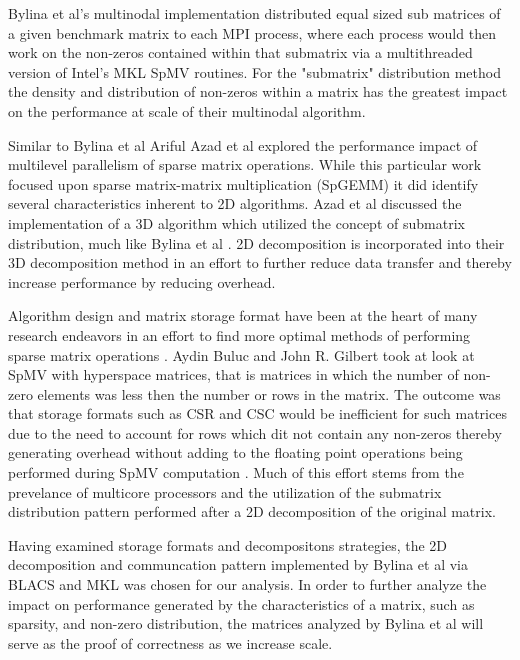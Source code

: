 Bylina et al's multinodal implementation distributed equal sized sub matrices of a given benchmark matrix to each MPI process, where each process would then work on the non-zeros contained within that submatrix via a multithreaded version of Intel's MKL SpMV routines. For the "submatrix" distribution method the density and distribution of non-zeros within a matrix has the greatest impact on the performance at scale of their multinodal algorithm.

Similar to Bylina et al Ariful Azad et al \cite{azad2016exploiting} explored the performance impact of multilevel parallelism of sparse matrix operations. While this particular work focused upon sparse matrix-matrix multiplication (SpGEMM) it did identify several characteristics inherent to 2D algorithms. Azad et al discussed the implementation of a 3D algorithm which utilized the concept of submatrix distribution, much like Bylina et al \cite{techbib:6933066}. 2D decomposition is incorporated into their 3D decomposition method in an effort to further reduce data transfer and thereby increase performance by reducing overhead.

Algorithm design and matrix storage format have been at the heart of many research endeavors in an effort to find more optimal methods of performing sparse matrix operations \cite{azd2016exploiting, Bulu2008OnTR} . Aydin Buluc and John R. Gilbert took at look at SpMV with hyperspace matrices, that is matrices in which the number of non-zero elements was less then the number or rows in the matrix. The outcome was that storage formats such as CSR and CSC would be inefficient for such matrices due to the need to account for rows which dit not contain any non-zeros thereby generating overhead without adding to the floating point operations being performed during SpMV computation \cite{Bulu2008OnTR}. Much of this effort stems from the prevelance of multicore processors and the utilization of the submatrix distribution pattern performed after a 2D decomposition of the original matrix. 

Having examined storage formats and decompositons strategies, the 2D decomposition and communcation pattern implemented by Bylina et al via BLACS and MKL was chosen for our analysis. In order to further analyze the impact on performance generated by the characteristics of a matrix, such as sparsity, and non-zero distribution, the matrices analyzed by Bylina et al will serve as the proof of correctness as we increase scale.

\bigskip

